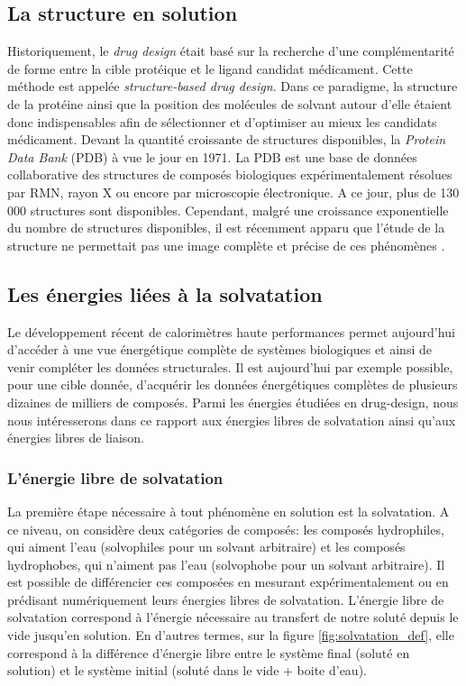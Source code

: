 \subsection{La structure en solution}
Historiquement, le \textit{drug design} était basé sur la recherche d'une complémentarité de forme entre la cible protéique et le ligand candidat médicament. Cette méthode est appelée \textit{structure-based drug design}\cite{Anderson_process_2003,Zhang_towards_2011,Agrawal_structure_2013}. Dans ce paradigme, la structure de la protéine ainsi que la position des molécules de solvant autour d'elle étaient donc indispensables afin de sélectionner et d'optimiser au mieux les candidats médicament. Devant la quantité croissante de structures disponibles, la \textit{Protein Data Bank}\cite{Bruno_crystallography_2017, Berman_protein_2000} (PDB) à vue le jour en 1971. La PDB est une base de données collaborative des structures de composés biologiques expérimentalement résolues par RMN\cite{Montelione_recommendations_2013}, rayon X\cite{Read_new_2011} ou encore par microscopie électronique\cite{Henderson_outcome_2012}. A ce jour, plus de 130 000 structures sont disponibles. Cependant, malgré une croissance exponentielle du nombre de structures disponibles, il est récemment apparu que l'étude de la structure ne permettait pas une image complète et précise de ces phénomènes \cite{Henry_structure_2001}. 


\subsection{Les énergies liées à la solvatation}
Le développement récent de calorimètres haute performances permet aujourd'hui d'accéder à une vue énergétique complète de systèmes biologiques\cite{Chaires_Calorimetry_2008, Garbett_thermodynamic_2012, Klebe_applying_2015} et ainsi de venir compléter les données structurales. Il est aujourd'hui par exemple possible, pour une cible donnée, d'acquérir les données énergétiques complètes de plusieurs dizaines de milliers de composés. Parmi les énergies étudiées en drug-design, nous nous intéresserons dans ce rapport aux énergies libres de solvatation ainsi qu'aux énergies libres de liaison.

\subsubsection{L'énergie libre de solvatation}
La première étape nécessaire à tout phénomène en solution est la solvatation. A ce niveau, on considère deux catégories de composés: les composés hydrophiles, qui aiment l'eau (solvophiles pour un solvant arbitraire) et les composés hydrophobes, qui n'aiment pas l'eau (solvophobe pour un solvant arbitraire). Il est possible de différencier ces composées en mesurant expérimentalement ou en prédisant numériquement leurs énergies libres de solvatation. L'énergie libre de solvatation correspond à l'énergie nécessaire au transfert de notre soluté depuis le vide jusqu'en solution. En d'autres termes, sur la figure \ref{fig:solvatation_def}, elle correspond à la différence d'énergie libre entre le système final (soluté en solution) et le système initial (soluté dans le vide + boite d'eau). 

